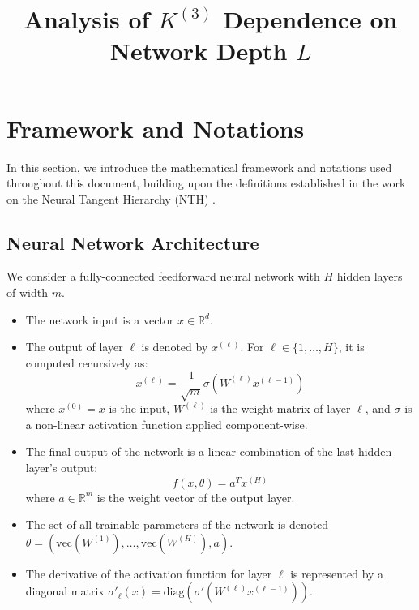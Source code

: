 \documentclass[11pt,a4paper]{article}
\title{\textbf{Analysis of $K^{(3)}$ Dependence on Network Depth $L$}}
\author{}
\date{}
\begin{document}
\maketitle


\tableofcontents

\newpage

\section{Framework and Notations}

In this section, we introduce the mathematical framework and notations used throughout this document, building upon the definitions established in the work on the Neural Tangent Hierarchy (NTH) \cite{dyer2019asymptoticswidenetworksfeynman}.

\subsection{Neural Network Architecture}

We consider a fully-connected feedforward neural network with $H$ hidden layers of width $m$.
\begin{itemize}
    \item The network input is a vector $x \in \mathbb{R}^d$.
    \item The output of layer $\ell$ is denoted by $x^{(\ell)}$. For $\ell \in \{1, \dots, H\}$, it is computed recursively as:
    \begin{equation}
        x^{(\ell)} = \frac{1}{\sqrt{m}}\sigma(W^{(\ell)}x^{(\ell-1)})
    \end{equation}
    where $x^{(0)} = x$ is the input, $W^{(\ell)}$ is the weight matrix of layer $\ell$, and $\sigma$ is a non-linear activation function applied component-wise.
    \item The final output of the network is a linear combination of the last hidden layer's output:
    \begin{equation}
        f(x, \theta) = a^T x^{(H)}
    \end{equation}
    where $a \in \mathbb{R}^m$ is the weight vector of the output layer.
    \item The set of all trainable parameters of the network is denoted $\theta = (\text{vec}(W^{(1)}), \dots, \text{vec}(W^{(H)}), a)$.
    \item The derivative of the activation function for layer $\ell$ is represented by a diagonal matrix $\sigma'_\ell(x) = \text{diag}(\sigma'(W^{(\ell)}x^{(\ell-1)}))$.
\end{itemize}
\end{document}

